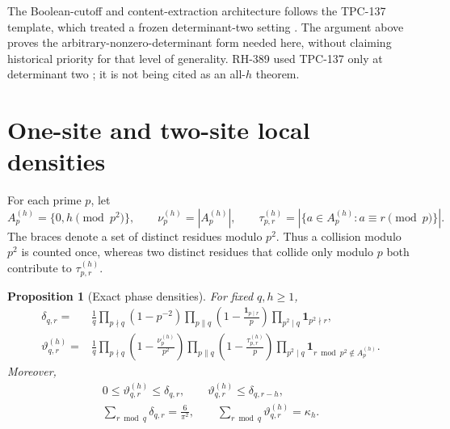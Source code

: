 \documentclass[11pt]{article}
\newtheorem{proposition}[theorem]{Proposition}
\theoremstyle{definition}
\theoremstyle{remark}
\newcommand{\dd}{\delta}
\newcommand{\thh}{\vartheta}
\newcommand{\kap}{\kappa}
\newcommand{\ind}{\mathbf 1}
\begin{document}
The Boolean-cutoff and content-extraction architecture follows the
TPC-137 template, which treated a frozen determinant-two setting
\cite{TPC137}.  The argument above proves the arbitrary-nonzero-determinant
form needed here, without claiming historical priority for that level of
generality.  RH-389 used TPC-137 only at determinant two
\cite{RH389}; it is not being cited as an all-\(h\) theorem.

\section{One-site and two-site local densities}
\label{sec:density}

For each prime \(p\), let
\[
 A_p^{(h)}=\{0,h\pmod {p^2}\},\qquad
 \nu_p^{(h)}=|A_p^{(h)}|,\qquad
 \tau_{p,r}^{(h)}=|\{a\in A_p^{(h)}:a\equiv r\pmod p\}|.
\]
The braces denote a set of distinct residues modulo \(p^2\).  Thus a
collision modulo \(p^2\) is counted once, whereas two distinct residues
that collide only modulo \(p\) both contribute to \(\tau_{p,r}^{(h)}\).

\begin{proposition}[Exact phase densities]
\label{prop:density}
For fixed \(q,h\ge1\),
\begin{align}
 \dd_{q,r}={}&\frac1q
 \prod_{p\nmid q}(1-p^{-2})
 \prod_{p\parallel q}\left(1-\frac{\ind_{p\mid r}}p\right)
 \prod_{p^2\mid q}\ind_{p^2\nmid r},
 \label{eq:delta-local}\\
 \thh^{(h)}_{q,r}={}&\frac1q
 \prod_{p\nmid q}\left(1-\frac{\nu_p^{(h)}}{p^2}\right)
 \prod_{p\parallel q}\left(1-\frac{\tau_{p,r}^{(h)}}p\right)
 \prod_{p^2\mid q}\ind_{r\bmod p^2\notin A_p^{(h)}}.
 \label{eq:theta-local}
\end{align}
Moreover,
\begin{gather}
 0\le\thh^{(h)}_{q,r}\le\dd_{q,r},\qquad
 \thh^{(h)}_{q,r}\le\dd_{q,r-h},
 \label{eq:cone}\\
 \sum_{r\bmod q}\dd_{q,r}=\frac6{\pi^2},\qquad
 \sum_{r\bmod q}\thh^{(h)}_{q,r}=\kap_h.
 \label{eq:totals}
\end{gather}
\end{proposition}
\end{document}
